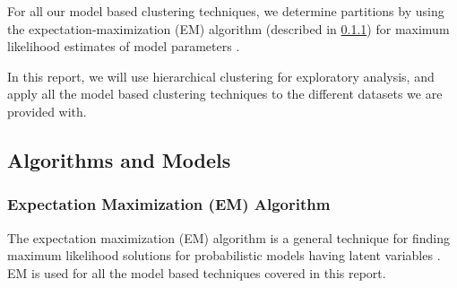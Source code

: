 For all our model based clustering techniques, we determine partitions by using the expectation-maximization (EM) algorithm (described in \ref{EM}) for maximum likelihood estimates of model parameters .

In this report, we will use hierarchical clustering for exploratory analysis, and apply all the model based clustering techniques to the different datasets we are provided with.


\subsection{Algorithms and Models}

\subsubsection{Expectation Maximization (EM) Algorithm}
\label{EM}

The expectation maximization (EM) algorithm is a general technique for finding maximum likelihood solutions for probabilistic models having latent variables \cite{bishop2006pattern}. EM is used for all the model based techniques covered in this report. 

